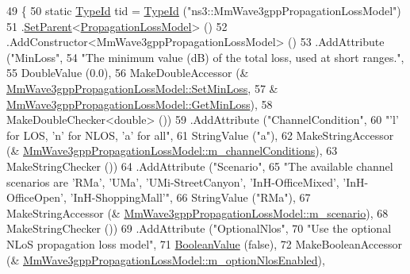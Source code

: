\begin{DoxyCode}
49 \{
50   \textcolor{keyword}{static} \hyperlink{classns3_1_1TypeId}{TypeId} tid = \hyperlink{classns3_1_1TypeId}{TypeId} (\textcolor{stringliteral}{"ns3::MmWave3gppPropagationLossModel"})
51     .\hyperlink{classns3_1_1TypeId_abaaca67ab7d2471067e7c275df0f7309}{SetParent}<\hyperlink{classns3_1_1PropagationLossModel}{PropagationLossModel}> ()
52     .AddConstructor<MmWave3gppPropagationLossModel> ()
53     .AddAttribute (\textcolor{stringliteral}{"MinLoss"},
54                    \textcolor{stringliteral}{"The minimum value (dB) of the total loss, used at short ranges."},
55                    DoubleValue (0.0),
56                    MakeDoubleAccessor (&
      \hyperlink{classMmWave3gppPropagationLossModel_a1431e2e95ebb21292fbd8732868fe8ef}{MmWave3gppPropagationLossModel::SetMinLoss},
57                                        &
      \hyperlink{classMmWave3gppPropagationLossModel_a13f78fefa8ddd09862e9b39ae5e3eabd}{MmWave3gppPropagationLossModel::GetMinLoss}),
58                    MakeDoubleChecker<double> ())
59     .AddAttribute (\textcolor{stringliteral}{"ChannelCondition"},
60                                         \textcolor{stringliteral}{"'l' for LOS, 'n' for NLOS, 'a' for all"},
61                                         StringValue (\textcolor{stringliteral}{"a"}),
62                                         MakeStringAccessor (&
      \hyperlink{classMmWave3gppPropagationLossModel_a416f5b42f67f2d950344b4746885230d}{MmWave3gppPropagationLossModel::m\_channelConditions}),
63                                         MakeStringChecker ())
64         .AddAttribute (\textcolor{stringliteral}{"Scenario"},
65                                 \textcolor{stringliteral}{"The available channel scenarios are 'RMa', 'UMa', 'UMi-StreetCanyon',
       'InH-OfficeMixed', 'InH-OfficeOpen', 'InH-ShoppingMall'"},
66                                 StringValue (\textcolor{stringliteral}{"RMa"}),
67                                 MakeStringAccessor (&
      \hyperlink{classMmWave3gppPropagationLossModel_a3ba2b9e45f4d02e49620faf03f97e898}{MmWave3gppPropagationLossModel::m\_scenario}),
68                                 MakeStringChecker ())
69         .AddAttribute (\textcolor{stringliteral}{"OptionalNlos"},
70                                 \textcolor{stringliteral}{"Use the optional NLoS propagation loss model"},
71                                 \hyperlink{classns3_1_1BooleanValue}{BooleanValue} (\textcolor{keyword}{false}),
72                                 MakeBooleanAccessor (&
      \hyperlink{classMmWave3gppPropagationLossModel_a5029858358d3c4dac793ebf3c8c6cc09}{MmWave3gppPropagationLossModel::m\_optionNlosEnabled}),

\end{DoxyCode}
